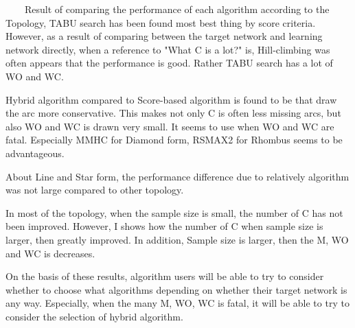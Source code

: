 ~~~~Result of comparing the performance of each algorithm according to the Topology, TABU search has been found most best thing by score criteria. However, as a result of comparing between the target network and learning network directly, when a reference to "What C is a lot?" is, Hill-climbing was often appears that the performance is good. Rather TABU search has a lot of WO and WC.

Hybrid algorithm compared to Score-based algorithm is found to be that draw the arc more conservative. This makes not only C is often less missing arcs, but also WO and WC is drawn very small. It seems to use when WO and WC are fatal. Especially MMHC for Diamond form, RSMAX2 for Rhombus seems to be advantageous.

About Line and Star form, the performance difference due to relatively algorithm was not large compared to other topology.

In most of the topology, when the sample size is small, the number of C has not been improved. However, I shows how the number of C when sample size is larger, then greatly improved. In addition, Sample size is larger, then the M, WO and WC is decreases.

On the basis of these results, algorithm users will be able to try to consider whether to choose what algorithms depending on whether their target network is any way. Especially, when the many M, WO, WC is fatal, it will be able to try to consider the selection of hybrid algorithm.

